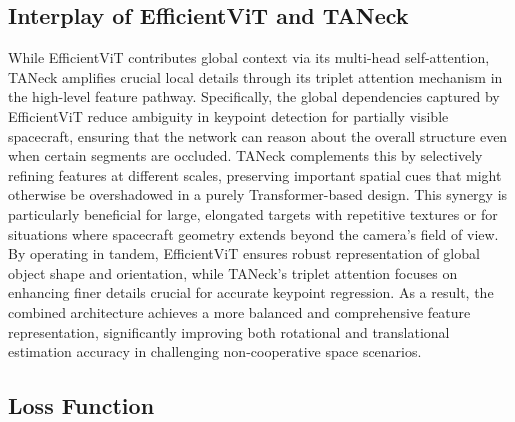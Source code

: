 \documentclass[a4paper,fleqn]{cas-sc}
\begin{document}
\subsection{Interplay of EfficientViT and TANeck}
 While EfficientViT contributes global context via its multi-head self-attention, TANeck amplifies crucial local details through its triplet attention mechanism in the high-level feature pathway. Specifically, the global dependencies captured by EfficientViT reduce ambiguity in keypoint detection for partially visible spacecraft, ensuring that the network can reason about the overall structure even when certain segments are occluded. TANeck complements this by selectively refining features at different scales, preserving important spatial cues that might otherwise be overshadowed in a purely Transformer-based design. This synergy is particularly beneficial for large, elongated targets with repetitive textures or for situations where spacecraft geometry extends beyond the camera’s field of view. By operating in tandem, EfficientViT ensures robust representation of global object shape and orientation, while TANeck’s triplet attention focuses on enhancing finer details crucial for accurate keypoint regression. As a result, the combined architecture achieves a more balanced and comprehensive feature representation, significantly improving both rotational and translational estimation accuracy in challenging non-cooperative space scenarios. 

\subsection{Loss Function}
\end{document}
